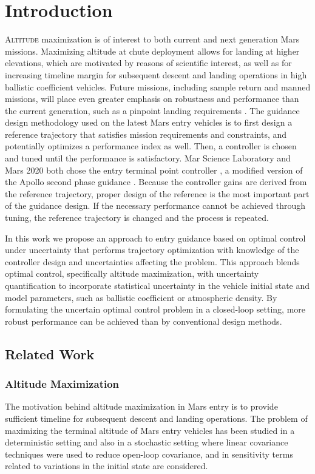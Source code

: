 \documentclass[journal ]{new-aiaa}
\begin{document}
\section*{Introduction}
\lettrine{A}{ltitude} maximization is of interest to both current and next generation Mars missions. Maximizing altitude at chute deployment allows for landing at higher elevations, which are motivated by reasons of scientific interest, as well as for increasing timeline margin for subsequent descent and landing operations in high ballistic coefficient vehicles.
Future missions, including sample return \cite{MSR} and manned missions, will place even greater emphasis on robustness and performance than the current generation, such as a pinpoint landing requirements \cite{EvolvableMars}. The guidance design methodology used on the latest Mars entry vehicles is to first design a reference trajectory that satisfies mission requirements and constraints, and potentially optimizes a performance index as well. Then, a controller is chosen and tuned until the performance is satisfactory. Mar Science Laboratory and Mars 2020 both chose the entry terminal point controller \cite{MSL_EDL,M2020_EDL}, a modified version of the Apollo second phase guidance \cite{MSL_EDL2}. Because the controller gains are derived from the reference trajectory, proper design of the reference is the most important part of the guidance design. If the necessary performance cannot be achieved through tuning, the reference trajectory is changed and the process is repeated.

In this work we propose an approach to entry guidance based on optimal control under uncertainty that performs trajectory optimization with knowledge of the controller design and uncertainties affecting the problem. This approach blends optimal control, specifically altitude maximization, with uncertainty quantification to incorporate statistical uncertainty in the vehicle initial state and model parameters, such as ballistic coefficient or atmospheric density. By formulating the uncertain optimal control problem in a closed-loop setting, more robust performance can be achieved than by conventional design methods.

\subsection*{Related Work}
\subsubsection*{Altitude Maximization}
The motivation behind altitude maximization in Mars entry is to provide sufficient timeline for subsequent descent and landing operations. The problem of maximizing the terminal altitude of Mars entry vehicles has been studied in a deterministic setting
\cite{AltitudeOptimization} %
\cite{AltitudeOptimizationIndirect}
\cite{GuangfeiDissertation}
and also in a stochastic setting \cite{AltitudeUnderUncertainty} where linear covariance techniques were used to reduce open-loop covariance, and in \cite{MarsEntryDesensitized} sensitivity terms related to variations in the initial state are considered.
\end{document}
